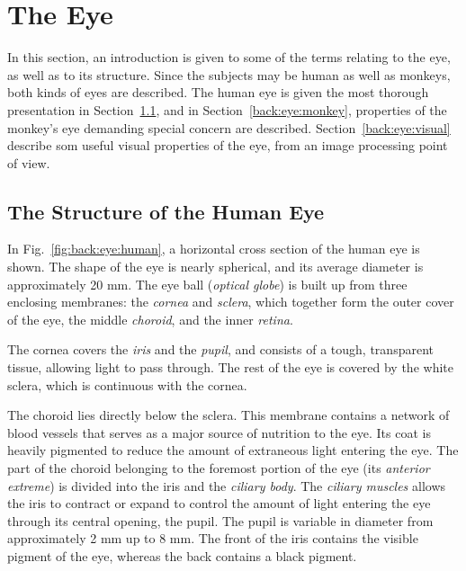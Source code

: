 
\section{The Eye}
\label{back:eye}

In this section, an introduction is given to some of the terms
relating to the eye, as well as to its structure.  Since the subjects
may be human as well as monkeys, both kinds of eyes are described.
The human eye is given the most thorough presentation in
Section~\ref{back:eye:human}, and in Section~\ref{back:eye:monkey},
properties of the monkey's eye demanding special concern are
described.  Section~\ref{back:eye:visual} describe som useful visual
properties of the eye, from an image processing point of view.

\subsection{The Structure of the Human Eye}
\label{back:eye:human}

In Fig.~\ref{fig:back:eye:human}, a horizontal cross section of the
human eye is shown.  The shape of the eye is nearly spherical, and its
average diameter is approximately 20 mm.  The eye ball ({\em optical
  globe\/}) is built up from three enclosing membranes: the {\em
  cornea\/} and {\em sclera\/}, which together form the outer cover of
the eye, the middle {\em choroid\/}, and the inner {\em retina\/}.

The cornea covers the {\em iris\/} and the {\em pupil\/}, and consists
of a tough, transparent tissue, allowing light to pass through.  The
rest of the eye is covered by the white sclera, which is continuous
with the cornea.

The choroid lies directly below the sclera.  This membrane contains a
network of blood vessels that serves as a major source of nutrition to
the eye.  Its coat is heavily pigmented to reduce the amount of
extraneous light entering the eye.  The part of the choroid belonging
to the foremost portion of the eye (its {\em anterior extreme\/}) is
divided into the iris and the {\em ciliary body\/}.  The {\em ciliary
  muscles\/} allows the iris to contract or expand to control the
amount of light entering the eye through its central opening, the
pupil.  The pupil is variable in diameter from approximately 2 mm up
to 8 mm.  The front of the iris contains the visible pigment of the
eye, whereas the back contains a black pigment.

